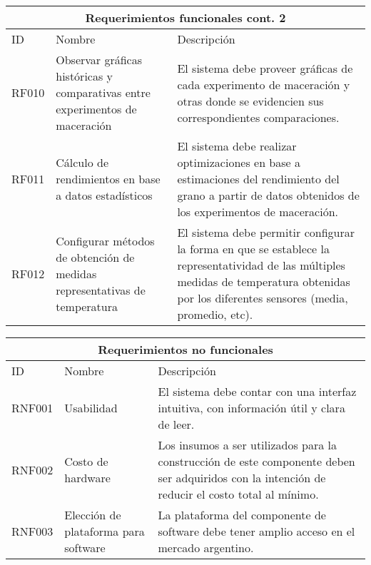     \begin{minipage}{0.95\textwidth}
    \begin{center}
    \begin{tabularx}{\textwidth}{| X | X | X |}
    \hline
    \multicolumn{3}{|c|}{\textbf{Requerimientos funcionales cont. 2}} \\
    \hline
    ID & Nombre & Descripción \\
    \hline
    \hline
         RF010 & Observar gráficas históricas y comparativas entre experimentos de maceración & El sistema debe proveer gráficas de cada experimento de maceración y otras donde se evidencien sus correspondientes comparaciones. \\\hline
         RF011 & Cálculo de rendimientos en base a datos estadísticos & El sistema debe realizar optimizaciones en base a estimaciones del rendimiento del grano a partir de datos obtenidos de los experimentos de maceración.
         \\\hline
         RF012 & Configurar métodos de obtención de medidas representativas de temperatura & El sistema debe permitir configurar la forma en que se establece la representatividad de las múltiples medidas de temperatura obtenidas por los diferentes sensores (media, promedio, etc).
     \\\hline
    \end{tabularx}
    \label{ReqFuncionales_Parte3}
    \end{center}
    \end{minipage}
    
    \begin{minipage}{0.95\textwidth}
    \begin{center}
    \begin{tabularx}{\textwidth}{| X | X | X |}
    \hline
    \multicolumn{3}{|c|}{\textbf{Requerimientos no funcionales}} \\
    \hline
    ID & Nombre & Descripción \\
    \hline
    \hline
         RNF001 & Usabilidad & El sistema debe contar con una interfaz intuitiva, con información útil y clara de leer. \\\hline
         RNF002 & Costo de hardware & Los insumos a ser utilizados para la construcción de este componente deben ser adquiridos con la intención de reducir el costo total al mínimo.
         \\\hline
         RNF003 & Elección de plataforma para software & La plataforma del componente de software debe tener amplio acceso en el mercado argentino. 
         \\\hline
     \end{tabularx}
    \label{ReqNoFuncionales_Parte2}
    \end{center}
    \end{minipage}
    
